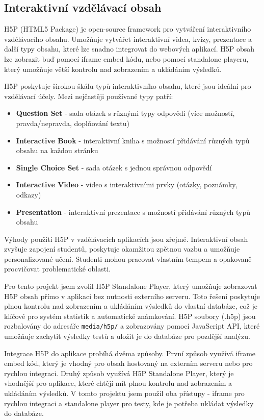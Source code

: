 \documentclass[a4paper,12pt]{article}
\begin{document}
\newpage

\subsection{Interaktivní vzdělávací obsah}

H5P (HTML5 Package) je open-source framework pro vytváření interaktivního vzdělávacího obsahu. Umožňuje vytvářet interaktivní videa, kvízy, prezentace a další typy obsahu, které lze snadno integrovat do webových aplikací. H5P obsah lze zobrazit buď pomocí iframe embed kódu, nebo pomocí standalone playeru, který umožňuje větší kontrolu nad zobrazením a ukládáním výsledků.

H5P poskytuje širokou škálu typů interaktivního obsahu, které jsou ideální pro vzdělávací účely. Mezi nejčastěji používané typy patří:

\begin{itemize}
    \item \textbf{Question Set} - sada otázek s různými typy odpovědí (více možností, pravda/nepravda, doplňování textu)
    \item \textbf{Interactive Book} - interaktivní kniha s možností přidávání různých typů obsahu na každou stránku
    \item \textbf{Single Choice Set} - sada otázek s jednou správnou odpovědí
    \item \textbf{Interactive Video} - video s interaktivními prvky (otázky, poznámky, odkazy)
    \item \textbf{Presentation} - interaktivní prezentace s možností přidávání různých typů obsahu
\end{itemize}

Výhody použití H5P v vzdělávacích aplikacích jsou zřejmé. Interaktivní obsah zvyšuje zapojení studentů, poskytuje okamžitou zpětnou vazbu a umožňuje personalizované učení. Studenti mohou pracovat vlastním tempem a opakovaně procvičovat problematické oblasti.

Pro tento projekt jsem zvolil H5P Standalone Player, který umožňuje zobrazovat H5P obsah přímo v aplikaci bez nutnosti externího serveru. Toto řešení poskytuje plnou kontrolu nad zobrazením a ukládáním výsledků do vlastní databáze, což je klíčové pro systém statistik a automatické známkování. H5P soubory (.h5p) jsou rozbalovány do adresáře \texttt{media/h5p/} a zobrazovány pomocí JavaScript API, které umožňuje zachytit výsledky testů a uložit je do databáze pro pozdější analýzu.

Integrace H5P do aplikace probíhá dvěma způsoby. První způsob využívá iframe embed kód, který je vhodný pro obsah hostovaný na externím serveru nebo pro rychlou integraci. Druhý způsob využívá H5P Standalone Player, který je vhodnější pro aplikace, které chtějí mít plnou kontrolu nad zobrazením a ukládáním výsledků. V tomto projektu jsem použil oba přístupy - iframe pro rychlou integraci a standalone player pro testy, kde je potřeba ukládat výsledky do databáze.
\end{document}
